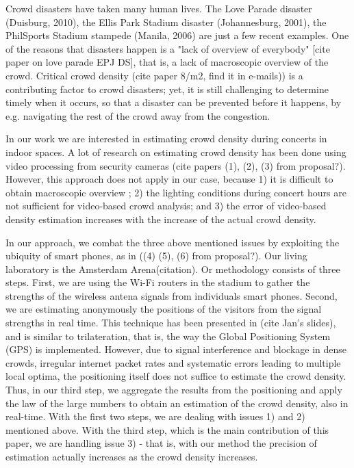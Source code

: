 \documentclass[10pt,a4paper]{article}
\begin{document}
Crowd disasters have taken many human lives. The Love Parade disaster (Duisburg, 2010), the Ellis Park Stadium disaster (Johannesburg, 2001), the PhilSports Stadium stampede (Manila, 2006) are just a few recent examples. One of the reasons that disasters happen is a "lack of overview of everybody" [cite paper on love parade EPJ DS], that is, a lack of macroscopic overview of the crowd. Critical crowd density (cite paper 8/m2, find it in e-mails)) is a contributing factor to crowd disasters; yet, it is still challenging to determine timely when it occurs, so that a disaster can be prevented before it happens, by e.g. navigating the rest of the crowd away from the congestion. 

In our work we are interested in estimating crowd density during concerts in indoor spaces. A lot of research on estimating crowd density has been done using video processing from security cameras (cite papers (1), (2), (3) from proposal?). However, this approach does not apply in our case, because 1)  it is difficult to obtain macroscopic overview ; 2) the lighting conditions during concert hours are not sufficient for video-based crowd analysis; and 3) the error of video-based density estimation increases with the increase of the actual crowd density.  

In our approach, we combat the three above mentioned issues by exploiting the ubiquity of smart phones, as in ((4) (5), (6) from proposal?). Our living laboratory is the Amsterdam Arena(citation). Or methodology consists of three steps.  First, we are using the Wi-Fi routers in the stadium to gather the strengths of the wireless antena signals from individuals smart phones.  Second, we are estimating anonymously the positions of the visitors from the signal strengths in real time. This technique has been presented in (cite Jan's slides), and is similar to trilateration, that is, the way the Global Positioning System (GPS) is implemented. However, due to signal interference and blockage in dense crowds, irregular internet packet rates and systematic errors leading to multiple local optima, the positioning itself does not suffice to estimate the crowd density. Thus, in our third step, we aggregate the results from the positioning and apply the law of the large numbers to obtain an estimation of the crowd density, also in real-time. With the first two steps, we are dealing with issues 1) and 2) mentioned above. With the third step, which is the main contribution of this paper, we are handling issue 3) -  that is, with our method the precision of estimation actually increases as the crowd density increases. 
\end{document}
